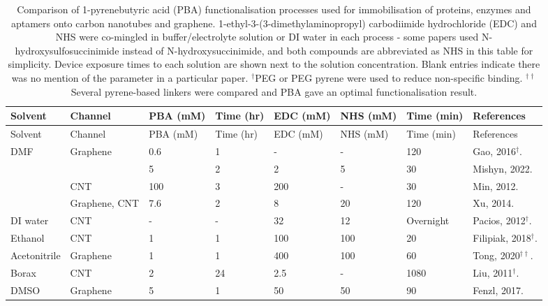 \documentclass[
  a4paper,
]{scrbook}
\begin{document}
\hypertarget{tbl-pba-functionalisation}{}
\begin{longtable}[]{@{}llllllll@{}}
\caption{\label{tbl-pba-functionalisation}Comparison of 1-pyrenebutyric
acid (PBA) functionalisation processes used for immobilisation of
proteins, enzymes and aptamers onto carbon nanotubes and graphene.
1-ethyl-3-(3-dimethylaminopropyl) carbodiimide hydrochloride (EDC) and
NHS were co-mingled in buffer/electrolyte solution or DI water in each
process - some papers used N-hydroxysulfosuccinimide instead of
N-hydroxysuccinimide, and both compounds are abbreviated as NHS in this
table for simplicity. Device exposure times to each solution are shown
next to the solution concentration. Blank entries indicate there was no
mention of the parameter in a particular paper. \(^†\)PEG or PEG pyrene
were used to reduce non-specific binding. \(^{††}\)Several pyrene-based
linkers were compared and PBA gave an optimal functionalisation
result.}\tabularnewline
\toprule\noalign{}
Solvent & Channel & PBA (mM) & Time (hr) & EDC (mM) & NHS (mM) & Time
(min) & References \\
\midrule\noalign{}
\endfirsthead
\toprule\noalign{}
Solvent & Channel & PBA (mM) & Time (hr) & EDC (mM) & NHS (mM) & Time
(min) & References \\
\midrule\noalign{}
\endhead
\bottomrule\noalign{}
\endlastfoot
DMF & Graphene & 0.6 & 1 & - & - & 120 & Gao, 2016\(^†\).
\cite{Gao2016} \\
& & 5 & 2 & 2 & 5 & 30 & Mishyn, 2022. \cite{Mishyn2022} \\
& CNT & 100 & 3 & 200 & - & 30 & Min, 2012. \cite{Min2012} \\
& Graphene, CNT & 7.6 & 2 & 8 & 20 & 120 & Xu, 2014. \cite{Xu2014} \\
DI water & CNT & - & - & 32 & 12 & Overnight & Pacios, 2012\(^†\).
\cite{Pacios2012} \\
Ethanol & CNT & 1 & 1 & 100 & 100 & 20 & Filipiak, 2018\(^†\).
\cite{Filipiak2018} \\
Acetonitrile & Graphene & 1 & 1 & 400 & 100 & 60 & Tong, 2020\(^{††}\).
\cite{Tong2020} \\
Borax & CNT & 2 & 24 & 2.5 & - & 1080 & Liu, 2011\(^†\).
\cite{Liu2011} \\
DMSO & Graphene & 5 & 1 & 50 & 50 & 90 & Fenzl, 2017.
\cite{Fenzl2017} \\
\end{longtable}

\newpage
{}
\end{document}
